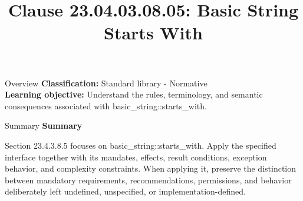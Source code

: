 \documentclass[10pt,letterpaper]{article}
\title{Clause 23.04.03.08.05: Basic String Starts With}
\author{}
\date{}
\begin{document}
\maketitle
\begin{CornellOverviewBox}{Overview}
\textbf{Classification:} Standard library - Normative\\[2pt]
\textbf{Learning objective:} Understand the rules, terminology, and semantic consequences associated with basic\_string::starts\_with.
\end{CornellOverviewBox}\begin{CornellSummaryBox}{Summary}
{\sffamily\bfseries\color{Accent} Summary}\par\vspace{3pt}Section 23.4.3.8.5 focuses on basic\_string::starts\_with. Apply the specified interface together with its mandates, effects, result conditions, exception behavior, and complexity constraints. When applying it, preserve the distinction between mandatory requirements, recommendations, permissions, and behavior deliberately left undefined, unspecified, or implementation-defined.
\end{CornellSummaryBox}
\end{document}
